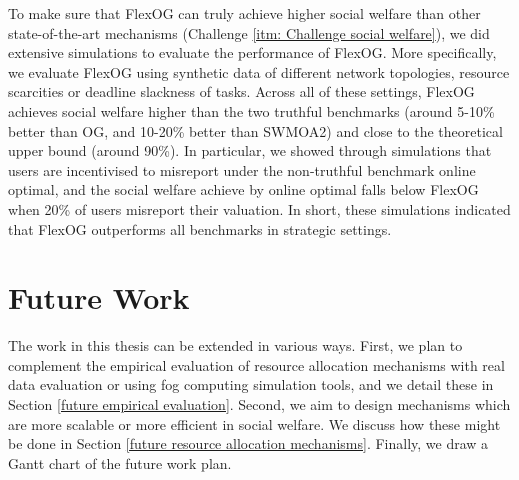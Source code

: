 \documentclass[11pt]{phdthesis}
\begin{document}
To make sure that FlexOG can truly achieve higher social welfare than other state-of-the-art mechanisms (Challenge \ref{itm: Challenge social welfare}), we did extensive simulations to evaluate the performance of FlexOG. More specifically, we evaluate FlexOG using synthetic data of different network topologies, resource scarcities or deadline slackness of tasks. Across all of these settings, FlexOG achieves social welfare higher than the two truthful benchmarks (around 5-10\% better than OG, and 10-20\% better than SWMOA2) and close to the theoretical upper bound (around 90\%). In particular, we showed through simulations that users are incentivised to misreport under the non-truthful benchmark online optimal, and the social welfare achieve by online optimal falls below FlexOG when 20\% of users misreport their valuation. In short, these simulations indicated that FlexOG outperforms all benchmarks in strategic settings. 


%
%


\section{Future Work} \label{future work}

The work in this thesis can be extended in various ways. First, we plan to complement the empirical evaluation of resource allocation mechanisms with real data evaluation or using fog computing simulation tools, and we detail these in Section \ref{future empirical evaluation}. Second, we aim to design mechanisms which are more scalable or more efficient in social welfare. We discuss how these might be done in Section \ref{future resource allocation mechanisms}. Finally, we draw a Gantt chart of the future work plan.
\end{document}
